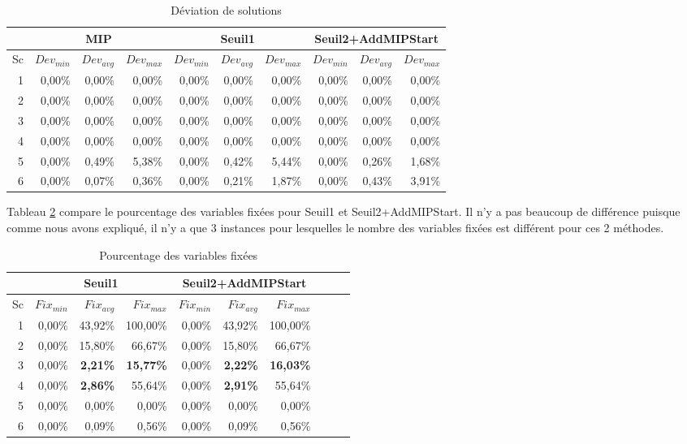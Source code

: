 \documentclass[twoside,fleqn]{EPURapport}
\begin{document}
\begin{table}[h]
    \centering
    \begin{tabular}{|r|r|r|r|r|r|r|r|r|r|}
    	\hline
    &	\multicolumn{3}{c|}{MIP} &\multicolumn{3}{c|}{Seuil1} & \multicolumn{3}{c|}{Seuil2+AddMIPStart}	\\ \hline
Sc & $Dev_{min}$ & $Dev_{avg}$	& $Dev_{max}$ & $Dev_{min}$ & $Dev_{avg}$	& $Dev_{max}$ & $Dev_{min}$ & $Dev_{avg}$	& $Dev_{max}$  \\ \hline
1&	0,00\%	&0,00\%	&0,00\%	&0,00\%	&0,00\%	&0,00\%	&0,00\%	&0,00\%	&0,00\%  \\ \hline
2&	0,00\%	&0,00\%	&0,00\%	&0,00\%	&0,00\%	&0,00\%	&0,00\%	&0,00\%	&0,00\%  \\ \hline
3&	0,00\%	&0,00\%	&0,00\%	&0,00\%	&0,00\%	&0,00\%	&0,00\%	&0,00\%	&0,00\% 	\\ \hline
4&	0,00\%	&0,00\%	&0,00\%	&0,00\%	&0,00\%	&0,00\%	&0,00\%	&0,00\%	&0,00\%  \\ \hline
5&	0,00\%	&0,49\%	&5,38\%	&0,00\%	&0,42\%	&5,44\%	&0,00\%	&0,26\%	&1,68\%  \\ \hline
6&	0,00\%	&0,07\%	&0,36\%	&0,00\%	&0,21\%	&1,87\%	&0,00\%	&0,43\%	&3,91\%  \\ \hline
    \end{tabular}
    \caption{Déviation de solutions}
    \label{tab_mip_s1_ams2_soldev}
\end{table}
\bigskip


Tableau \ref{tab_s1_ams2_fix} compare le pourcentage des variables fixées pour Seuil1 et Seuil2+AddMIPStart. Il n'y a pas beaucoup de différence puisque comme nous avons expliqué, il n'y a que 3 instances pour lesquelles le nombre des variables fixées est différent pour ces 2 méthodes.

\begin{table}[h]
    \centering
    \begin{tabular}{|r|r|r|r|r|r|r|r|r|r|}
    	\hline
   	&\multicolumn{3}{c|}{Seuil1} & \multicolumn{3}{c|}{Seuil2+AddMIPStart}	\\ \hline
Sc 	& $Fix_{min}$ & $Fix_{avg}$	& $Fix_{max}$   & $Fix_{min}$ & $Fix_{avg}$	& $Fix_{max}$             \\ \hline
1&  	0,00\%&	43,92\%&	100,00\%&  0,00\%&	43,92\%&	100,00\%\\ \hline
2& 	    0,00\%&	15,80\%&	66,67\%&  0,00\%&	15,80\%&	66,67\%   \\ \hline
3&  	0,00\%&	\textbf{2,21\%}&	\textbf{15,77\%}&  0,00\%&	\textbf{2,22\%}&	\textbf{16,03\%}    \\ \hline
4&		0,00\%&	\textbf{2,86\%}&	55,64\%&  0,00\%&	\textbf{2,91\%}&	55,64\% \\ \hline
5&		0,00\%&	0,00\%&	0,00\%&  0,00\%&	0,00\%&	0,00\%   \\ \hline
6&		0,00\%&	0,09\%&	0,56\%&  0,00\%&	0,09\%&	0,56\%    \\ \hline
    \end{tabular}
    \caption{Pourcentage des variables fixées}
    \label{tab_s1_ams2_fix}
\end{table}
\bigskip
\end{document}

